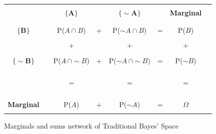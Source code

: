 \documentclass[
  12 pt,
  a4paper,
]{book}
\numberwithin{equation}{section}
\theoremstyle{plain}      %
\theoremstyle{definition} %
\theoremstyle{remark}     %
\theoremstyle{note}         %
\begin{document}
\begin{figure}[htbp]
\centering

\begin{tabular}{|c|c c c c c c c|}

\hline
               & &                       & &                 & &                &   \\
               
& & $\mathbf{\{A\}}$  & & $\mathbf{\{\sim\! A \}}$  & & \textbf{Marginal}       &   \\

               & &                       & &                 & &                &   \\
\hline
               & &                       & &                 & &                &   \\

$\mathbf{\{B\}}$  & & P($A \cap B$)      & + & P($\sim\! A \cap B$) & = & P($B$)  &    \\

               & &                       & &                 & &                &   \\
               & & +                     & &   +             & &       +        &   \\
               & &                       & &                 & &                &   \\
$\mathbf{\{\sim\! B \}}$ & & P($A\, \cap \sim\! B$)  & + & P($\sim\! A\, \cap \sim\! B$) & = & P($\sim\! B$)  & \\
               & &                       & &                 & &                &   \\
               & & \text{ }\begin{rotate}{90}=\end{rotate}     &   & \text{ }\begin{rotate}{90}=\end{rotate}   &   &  \text{ }\begin{rotate}{90}=\end{rotate}    & \\
               & &                       & &                 & &                &   \\
\textbf{Marginal} & & P($A$)             & + & P($\sim\! A$) & = & $\Omega$       &   \\
               & &                       & &                 & &                &   \\
\hline

\end{tabular}
\caption{Marginals and sums network of Traditional Bayes' Space}
\label{fig:m_bayes_space}

\end{figure}
\end{document}
